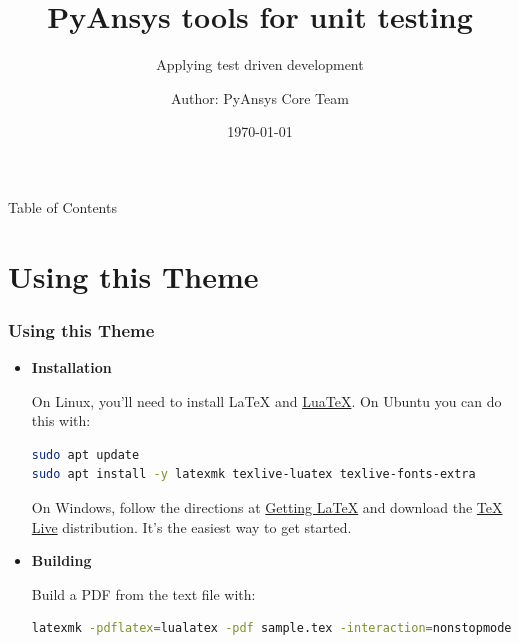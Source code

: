\documentclass[t]{beamer}
\begin{document}

\title{PyAnsys tools for unit testing}
\subtitle{Applying test driven development}
\author{Author: PyAnsys Core Team}
\date{\today}

\titleframe{}



\begin{frame}{Table of Contents}
  \tableofcontents
  \vspace{200pt}  %
\end{frame}


\section{Using this Theme}
\begin{frame}[fragile=singleslide]
  \frametitle{Using this Theme}

  \begin{itemize}

  \item{\textbf{Installation}
    
    On Linux, you'll need to install LaTeX and
    \href{https://www.luatex.org/}{LuaTeX}. On Ubuntu you can do this with:

    \begin{lstlisting}[language=bash,basicstyle=\footnotesize\ttfamily]
sudo apt update
sudo apt install -y latexmk texlive-luatex texlive-fonts-extra
    \end{lstlisting}


    On Windows, follow the directions at
    \href{https://www.latex-project.org/get/}{Getting LaTeX} and download the
    \href{HTTP://www.tug.org/texlive}{TeX Live} distribution. It's the easiest
    way to get started.
  }

  \item{\textbf{Building}

    Build a PDF from the text file with:

    \begin{lstlisting}[language=bash,basicstyle=\footnotesize\ttfamily]
latexmk -pdflatex=lualatex -pdf sample.tex -interaction=nonstopmode -outdir=./build
    \end{lstlisting}

    }

  \end{itemize}

\end{frame}
\end{document}
